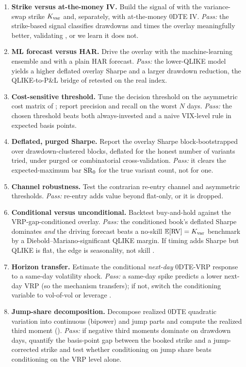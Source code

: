 \begin{projectconnection}
\begin{enumerate}
  \item \textbf{Strike versus at-the-money IV.} Build the signal of  with the variance-swap strike $K_{\mathrm{var}}$ and, separately, with at-the-money 0DTE IV. \emph{Pass:} the strike-based signal classifies drawdowns and times the overlay meaningfully better, validating , or we learn it does not.
  \item \textbf{ML forecast versus HAR.} Drive the overlay with the machine-learning ensemble and with a plain HAR forecast. \emph{Pass:} the lower-QLIKE model yields a higher deflated overlay Sharpe and a larger drawdown reduction, the QLIKE-to-P\&L bridge of  retested on the real index.
  \item \textbf{Cost-sensitive threshold.} Tune the decision threshold on the asymmetric cost matrix of ; report precision and recall on the worst $N$ days. \emph{Pass:} the chosen threshold beats both always-invested and a naive VIX-level rule in expected basis points.
  \item \textbf{Deflated, purged Sharpe.} Report the overlay Sharpe block-bootstrapped over drawdown-clustered blocks, deflated for the honest number of variants tried, under purged or combinatorial cross-validation. \emph{Pass:} it clears the expected-maximum bar $\operatorname{SR}_0$ for the true variant count, not for one.
  \item \textbf{Channel robustness.} Test the contrarian re-entry channel and asymmetric thresholds. \emph{Pass:} re-entry adds value beyond flat-only, or it is dropped.
  \item \textbf{Conditional versus unconditional.} Backtest buy-and-hold against the VRP-gap-conditioned overlay. \emph{Pass:} the conditioned book's deflated Sharpe dominates \emph{and} the driving forecast beats a no-skill $\mathbb{E}[\operatorname{RV}]=K_{\mathrm{var}}$ benchmark by a Diebold--Mariano-significant QLIKE margin. If timing adds Sharpe but QLIKE is flat, the edge is seasonality, not skill \citep[the tension between][]{Vilkov2024, AlmeidaFreireHizmeri2024}.
  \item \textbf{Horizon transfer.} Estimate the conditional \emph{next-day} 0DTE-VRP response to a same-day volatility shock. \emph{Pass:} a same-day spike predicts a lower next-day VRP (so the \citet{Yang2024} mechanism transfers); if not, switch the conditioning variable to vol-of-vol or leverage \citep{BandiFusariReno2024}.
  \item \textbf{Jump-share decomposition.} Decompose realized 0DTE quadratic variation into continuous (bipower) and jump parts and compute the realized third moment (). \emph{Pass:} if negative third moments dominate on drawdown days, quantify the basis-point gap between the booked strike and a jump-corrected strike \citep{DuKapadia2012} and test whether conditioning on jump share beats conditioning on the VRP level alone.
\end{enumerate}
\end{projectconnection}

